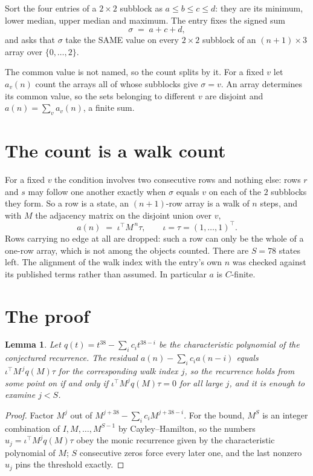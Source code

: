 \documentclass[11pt,a4paper]{article}
\theoremstyle{plain}
\newtheorem{lemma}[theorem]{Lemma}
\theoremstyle{definition}
\begin{document}
Sort the four entries of a $2\times2$ subblock as $a\le b\le c\le d$: they
are its minimum, lower median, upper median and maximum. The entry fixes the signed sum
\[
\sigma\;=\;a+c+d,
\]
and asks that $\sigma$ take the SAME value on every $2\times2$ subblock of an
$(n+1)\times3$ array over $\{0,\dots,2\}$.

The common value is not named, so the count splits by it. For a fixed $v$ let $a_v(n)$ count
the arrays all of whose subblocks give $\sigma=v$. An array determines its common value, so
the sets belonging to different $v$ are disjoint and $a(n)=\sum_v a_v(n)$, a finite sum.


\section{The count is a walk count}

For a fixed $v$ the condition involves two consecutive rows and nothing
else: rows $r$ and $s$ may follow one another exactly when $\sigma$ equals $v$ on each of the
$2$ subblocks they form. So a row is a state, an $(n+1)$-row array is a walk of $n$
steps, and with $M$ the adjacency matrix on the disjoint union over $v$,
\[
a(n)\;=\;\iota^{\!\top}M^{\,n}\tau,\qquad\iota=\tau=(1,\dots,1)^{\!\top} .
\]
Rows carrying no edge at all are dropped: such a row can only be the whole of a one-row
array, which is not among the objects counted. There are $S=78$ states left.
The alignment of the walk index with the entry's own $n$ was checked against its published
terms rather than assumed. In particular $a$ is $C$-finite.

\section{The proof}

\begin{lemma}\label{lem:crit}
Let $q(t)=t^{38}-\sum_i c_it^{38-i}$ be the characteristic polynomial of the
conjectured recurrence. The residual $a(n)-\sum_ic_ia(n-i)$ equals
$\iota^{\!\top}M^{\,j}q(M)\tau$ for the corresponding walk index $j$, so the recurrence
holds from some point on if and only if $\iota^{\!\top}M^{j}q(M)\tau=0$ for all large $j$,
and it is enough to examine $j<S$.
\end{lemma}

\begin{proof}
Factor $M^{j}$ out of $M^{j+38}-\sum_ic_iM^{j+38-i}$. For the bound, $M^{S}$
is an integer combination of $I,M,\dots,M^{S-1}$ by Cayley--Hamilton, so the numbers
$u_j=\iota^{\!\top}M^{j}q(M)\tau$ obey the monic recurrence given by the characteristic
polynomial of $M$; $S$ consecutive zeros force every later one, and the last nonzero $u_j$
pins the threshold exactly.
\end{proof}
\end{document}
